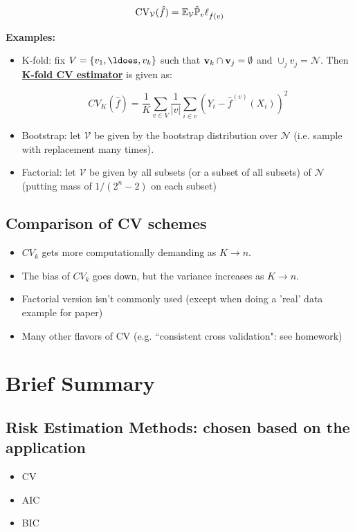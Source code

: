 \documentclass[10pt]{article}
\begin{document}
	\begin{equation}
		\textrm{CV}_{\mathcal{V}}(\hat{f}) = \mathbb{E}_{\mathcal{V}}\hat{\mathbb{P}}_{v}\ell_{\hat{f}(v)}
	\end{equation}
	
	\textbf{Examples:}
	
		\begin{itemize}
			\item K-fold: fix $V = \{ v_1, \ldoes, v_k \}$ such that $\mathbf{v}_k \cap \mathbf{v}_j = \emptyset$ and $\cup_j v_j = \mathcal{N}$. Then \underline{\textbf{K-fold CV estimator}} is given as:
			
				\begin{equation}
					CV_K(\hat{f}) = \frac{1}{K} \sum_{v \in V} \frac{1}{|v|} \sum_{i \in v} (Y_i - \hat{f}^{(v)}(X_i))^2
				\end{equation}
				
			\item Bootstrap: let $\mathcal{V}$ be given by the bootstrap distribution over $\mathcal{N}$ (i.e. sample with replacement many times).
			\item Factorial: let $\mathcal{V}$ be given by all subsets (or a subset of all subsets) of $\mathcal{N}$ (putting mass of $1/(2^n - 2)$ on each subset)
		\end{itemize}
	
	\subsection{Comparison of CV schemes}
		\begin{itemize}
			\item $CV_k$ gets more computationally demanding as $K \rightarrow n$.
			\item The bias of $CV_k$ goes down, but the variance increases as $K \rightarrow n$.
			\item Factorial version isn't commonly used (except when doing a 'real' data example for paper)
			\item Many other flavors of CV (e.g. ``consistent cross validation": see homework)
		\end{itemize}

\section{Brief Summary}

	\subsection{Risk Estimation Methods: chosen based on the application}
		\begin{itemize}
			\item CV
			\item AIC
			\item BIC
		\end{itemize}
		
\end{document}
